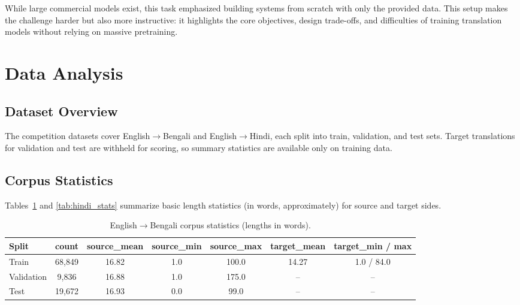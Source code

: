 \documentclass[11pt, oneside]{article}   	%
\begin{document}
While large commercial models exist, this task emphasized building systems from scratch with only the provided data. This setup makes the challenge harder but also more instructive: it highlights the core objectives, design trade-offs, and difficulties of training translation models without relying on massive pretraining.


\section{Data Analysis}

\subsection{Dataset Overview}
The competition datasets cover English$\rightarrow$Bengali and English$\rightarrow$Hindi, each split into train, validation, and test sets. Target translations for validation and test are withheld for scoring, so summary statistics are available only on training data.

\subsection{Corpus Statistics}
Tables~\ref{tab:bengali_stats} and \ref{tab:hindi_stats} summarize basic length statistics (in words, approximately) for source and target sides.

\begin{table}[h]
\centering
\caption{English$\rightarrow$Bengali corpus statistics (lengths in words).}
\label{tab:bengali_stats}
\begin{tabular}{|l|c|c|c|c|c|c|}
\hline
\textbf{Split} & \textbf{count} & \textbf{source\_mean} & \textbf{source\_min} & \textbf{source\_max} & \textbf{target\_mean} & \textbf{target\_min / max} \\
\hline
Train       & 68{,}849 & 16.82 & 1.0 & 100.0 & 14.27 & 1.0 / 84.0 \\
Validation  & 9{,}836  & 16.88 & 1.0 & 175.0 & --    & -- \\
Test        & 19{,}672 & 16.93 & 0.0 & 99.0  & --    & -- \\
\hline
\end{tabular}
\end{table}
\end{document}
